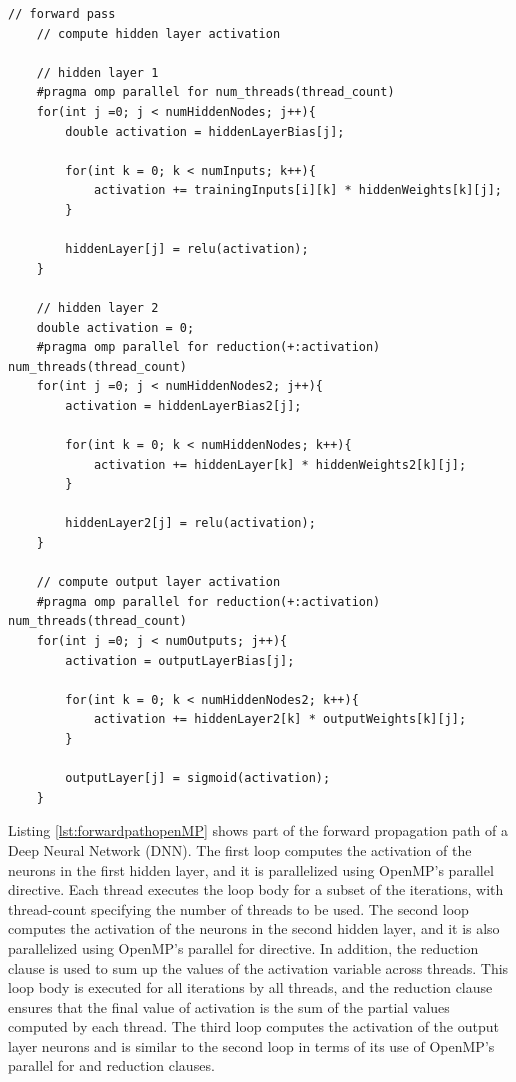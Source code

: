 \documentclass[11pt]{article}
\begin{document}
\begin{lstlisting}[style=CStyle, caption={Forward path openMP of main.c}, label={lst:forwardpathopenMP}]
    // forward pass
    // compute hidden layer activation

    // hidden layer 1
    #pragma omp parallel for num_threads(thread_count)
    for(int j =0; j < numHiddenNodes; j++){
        double activation = hiddenLayerBias[j];

        for(int k = 0; k < numInputs; k++){
            activation += trainingInputs[i][k] * hiddenWeights[k][j];
        }

        hiddenLayer[j] = relu(activation);
    }

    // hidden layer 2
    double activation = 0;
    #pragma omp parallel for reduction(+:activation) num_threads(thread_count)
    for(int j =0; j < numHiddenNodes2; j++){
        activation = hiddenLayerBias2[j];

        for(int k = 0; k < numHiddenNodes; k++){
            activation += hiddenLayer[k] * hiddenWeights2[k][j];
        }

        hiddenLayer2[j] = relu(activation);
    }

    // compute output layer activation
    #pragma omp parallel for reduction(+:activation) num_threads(thread_count)
    for(int j =0; j < numOutputs; j++){
        activation = outputLayerBias[j];

        for(int k = 0; k < numHiddenNodes2; k++){
            activation += hiddenLayer2[k] * outputWeights[k][j];
        }

        outputLayer[j] = sigmoid(activation);
    }
\end{lstlisting}


Listing \ref{lst:forwardpathopenMP} shows part of the forward propagation path of a Deep Neural Network (DNN). The first loop computes the activation of the neurons in the first hidden layer, and it is parallelized using OpenMP's parallel directive. Each thread executes the loop body for a subset of the iterations, with thread-count specifying the number of threads to be used. The second loop computes the activation of the neurons in the second hidden layer, and it is also parallelized using OpenMP's parallel for directive. In addition, the reduction clause is used to sum up the values of the activation variable across threads. This loop body is executed for all iterations by all threads, and the reduction clause ensures that the final value of activation is the sum of the partial values computed by each thread. The third loop computes the activation of the output layer neurons and is similar to the second loop in terms of its use of OpenMP's parallel for and reduction clauses. 
\end{document}
